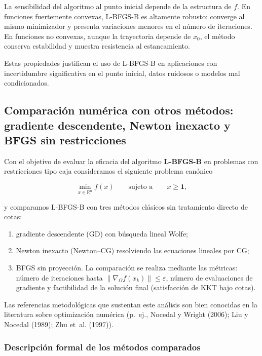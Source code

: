 \documentclass[
  spanish,
  us-letterpaper,
  DIV=11,
  numbers=noendperiod]{scrreprt}
\providecommand{\tightlist}{%
  \setlength{\itemsep}{0pt}\setlength{\parskip}{0pt}}
\numberwithin{equation}{section}
\begin{document}
La sensibilidad del algoritmo al punto inicial depende de la estructura
de \(f\). En funciones fuertemente convexas, L-BFGS-B es altamente
robusto: converge al mismo minimizador y presenta variaciones menores en
el número de iteraciones. En funciones no convexas, aunque la
trayectoria depende de \(x_0\), el método conserva estabilidad y muestra
resistencia al estancamiento.

Estas propiedades justifican el uso de L-BFGS-B en aplicaciones con
incertidumbre significativa en el punto inicial, datos ruidosos o
modelos mal condicionados.

\subsection{Comparación numérica con otros métodos: gradiente
descendente, Newton inexacto y BFGS sin
restricciones}\label{comparaciuxf3n-numuxe9rica-con-otros-muxe9todos-gradiente-descendente-newton-inexacto-y-bfgs-sin-restricciones}

Con el objetivo de evaluar la eficacia del algoritmo \textbf{L-BFGS-B}
en problemas con restricciones tipo caja consideramos el siguiente
problema canónico

\[
\min_{x\in\mathbb{R}^n} f(x)\qquad\text{sujeto a}\qquad x \ge \mathbf{1},
\tag{3.110}
\]

y comparamos L-BFGS-B con tres métodos clásicos sin tratamiento directo
de cotas:

\begin{enumerate}
\def\labelenumi{(\roman{enumi})}
\tightlist
\item
  gradiente descendente (GD) con búsqueda lineal Wolfe;
\item
  Newton inexacto (Newton--CG) resolviendo las ecuaciones lineales por
  CG;
\item
  BFGS sin proyección. La comparación se realiza mediante las métricas:
  número de iteraciones hasta
  \(\|\nabla_\Omega f(x_k)\|\le\varepsilon\), número de evaluaciones de
  gradiente y factibilidad de la solución final (satisfacción de KKT
  bajo cotas).
\end{enumerate}

Las referencias metodológicas que sustentan este análisis son bien
conocidas en la literatura sobre optimización numérica (p.~ej., Nocedal
y Wright (2006); Liu y Nocedal (1989); Zhu et~al. (1997)).

\subsubsection{Descripción formal de los métodos
comparados}\label{descripciuxf3n-formal-de-los-muxe9todos-comparados}
\end{document}
